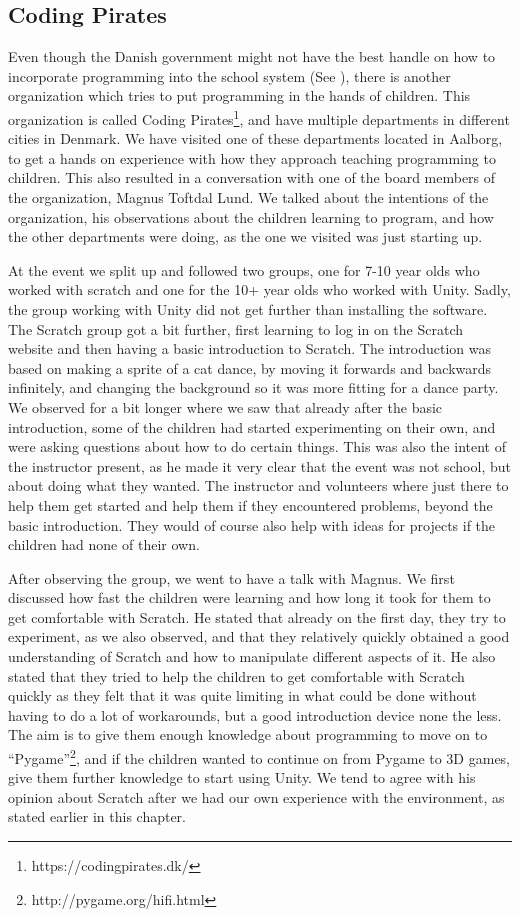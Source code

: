 \subsection{Coding Pirates}
\label{sec:coding_pirates}
Even though the Danish government might not have the best handle on how to incorporate programming into the school system (See ), there is another organization which tries to put programming in the hands of children. This organization is called Coding Pirates\footnote{https://codingpirates.dk/}, and have multiple departments in different cities in Denmark. We have visited one of these departments located in Aalborg, to get a hands on experience with how they approach teaching programming to children. This also resulted in a conversation with one of the board members of the organization, Magnus Toftdal Lund. We talked about the intentions of the organization, his observations about the children learning to program, and how the other departments were doing, as the one we visited was just starting up.

At the event we split up and followed two groups, one for 7-10 year olds who worked with scratch and one for the 10+ year olds who worked with Unity. Sadly, the group working with Unity did not get further than installing the software. The Scratch group got a bit further, first learning to log in on the Scratch website and then having a basic introduction to Scratch. The introduction was based on making a sprite of a cat dance, by moving it forwards and backwards infinitely, and changing the background so it was more fitting for a dance party. We observed for a bit longer where we saw that already after the basic introduction, some of the children had started experimenting on their own, and were asking questions about how to do certain things. This was also the intent of the instructor present, as he made it very clear that the event was not school, but about doing what they wanted. The instructor and volunteers where just there to help them get started and help them if they encountered problems, beyond the basic introduction. They would of course also help with ideas for projects if the children had none of their own.

After observing the group, we went to have a talk with Magnus. We first discussed how fast the children were learning and how long it took for them to get comfortable with Scratch. He stated that already on the first day, they try to experiment, as we also observed, and that they relatively quickly obtained a good understanding of Scratch and how to manipulate different aspects of it. He also stated that they tried to help the children to get comfortable with Scratch quickly as they felt that it was quite limiting in what could be done without having to do a lot of workarounds, but a good introduction device none the less. The aim is to give them enough knowledge about programming to move on to ``Pygame''\footnote{http://pygame.org/hifi.html}, and if the children wanted to continue on from Pygame to 3D games, give them further knowledge to start using Unity. We tend to agree with his opinion about Scratch after we had our own experience with the environment, as stated earlier in this chapter.

